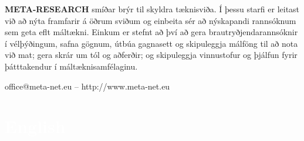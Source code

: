 \begin{multicols}{2}
\textbf{META-RESEARCH} smíðar brýr til skyldra tæknisviða. Í þessu starfi er leitast við að nýta framfarir á öðrum sviðum og einbeita sér að nýskapandi rannsóknum sem geta eflt máltækni. Einkum er stefnt að því að gera brautryðjendarannsóknir í vélþýðingum, safna gögnum, útbúa gagnasett og skipuleggja málföng til að nota við mat; gera skrár um tól og aðferðir; og skipuleggja vinnustofur og þjálfun fyrir þátttakendur í máltæknisamfélaginu.\\

\centerline{office@meta-net.eu -- http://www.meta-net.eu}

\end{multicols}

\vfill

\makeatletter
{}
{
  \renewcommand*{\theHsection}{\thepart.\thesection}}
\makeatother
\part*{\textcolor{white}{English}}
\setcounter{section}{0}
\setcounter{figure}{0}


\cleardoublepage



